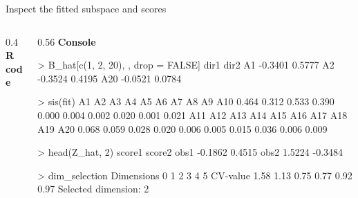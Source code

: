 \documentclass[
  ignorenonframetext,
  aspectratio=169,
  11pt]{beamer}
\newenvironment{Shaded}{\begin{snugshade}}{\end{snugshade}}
\newcommand{\ConstantTok}[1]{\textcolor[rgb]{0.56,0.35,0.01}{#1}}
\newcommand{\DecValTok}[1]{\textcolor[rgb]{0.68,0.00,0.00}{#1}}
\newcommand{\FunctionTok}[1]{\textcolor[rgb]{0.28,0.35,0.67}{#1}}
\newcommand{\NormalTok}[1]{\textcolor[rgb]{0.00,0.23,0.31}{#1}}
\newcommand{\OtherTok}[1]{\textcolor[rgb]{0.00,0.23,0.31}{#1}}
\newcommand{\SpecialCharTok}[1]{\textcolor[rgb]{0.37,0.37,0.37}{#1}}
\newcommand{\workflowcodefont}{\fontsize{6.3}{7.1}\selectfont}
\newcommand{\method}[1]{%
  \textcolor{emoryblue}{\textbf{#1}}%
}
\begin{document}
\begin{frame}[fragile,t]{Inspect the fitted subspace and scores}
\label{inspect-the-fitted-subspace-and-scores}
\begin{columns}[T]
\begin{column}{0.4\linewidth}
\method{R code}

\workflowcodefont

\begin{Shaded}
\end{Shaded}
\end{column}

\begin{column}{0.56\linewidth}
\method{Console}

\workflowcodefont

\begin{Shaded}
\begin{Highlighting}[]
\NormalTok{\textgreater{} B\_hat[c(1, 2, 20), , drop = FALSE]}
\NormalTok{       dir1    dir2}
\NormalTok{A1 {-}0.3401  0.5777}
\NormalTok{A2 {-}0.3524  0.4195}
\NormalTok{A20 {-}0.0521 0.0784}

\NormalTok{\textgreater{} sis(fit)}
\NormalTok{    A1    A2    A3    A4    A5    A6    A7    A8    A9   A10}
\NormalTok{ 0.464 0.312 0.533 0.390 0.000 0.004 0.002 0.020 0.001 0.021}
\NormalTok{   A11   A12   A13   A14   A15   A16   A17   A18   A19   A20}
\NormalTok{ 0.068 0.059 0.028 0.020 0.006 0.005 0.015 0.036 0.006 0.009}

\NormalTok{\textgreater{} head(Z\_hat, 2)}
\NormalTok{       score1  score2}
\NormalTok{obs1  {-}0.1862  0.4515}
\NormalTok{obs2   1.5224 {-}0.3484}

\NormalTok{\textgreater{} dim\_selection}
\NormalTok{Dimensions      0    1    2    3    4    5}
\NormalTok{CV{-}value     1.58 1.13 0.75 0.77 0.92 0.97}
\NormalTok{Selected dimension: 2}
\end{Highlighting}
\end{Shaded}
\end{column}
\end{columns}
\end{frame}
\end{document}
